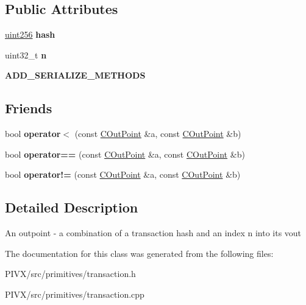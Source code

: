 \subsection*{Public Attributes}
\begin{DoxyCompactItemize}
\item 
\mbox{\label{class_c_out_point_af131c7194a660558b0ff158f4efa7a28}} 
\mbox{\hyperlink{classuint256}{uint256}} {\bfseries hash}
\item 
\mbox{\label{class_c_out_point_a1b857e3a0412ff741da2c9f8defe315c}} 
uint32\+\_\+t {\bfseries n}
\item 
\mbox{\label{class_c_out_point_ac025da4b121ed1bca9a4d88bcb9d3a90}} 
{\bfseries A\+D\+D\+\_\+\+S\+E\+R\+I\+A\+L\+I\+Z\+E\+\_\+\+M\+E\+T\+H\+O\+DS}
\end{DoxyCompactItemize}
\subsection*{Friends}
\begin{DoxyCompactItemize}
\item 
\mbox{\label{class_c_out_point_a83395b7e70479c621c95e1a0d7f2497c}} 
bool {\bfseries operator$<$} (const \mbox{\hyperlink{class_c_out_point}{C\+Out\+Point}} \&a, const \mbox{\hyperlink{class_c_out_point}{C\+Out\+Point}} \&b)
\item 
\mbox{\label{class_c_out_point_a30d4f5afdf664bb4ea5a3496bbc2bd12}} 
bool {\bfseries operator==} (const \mbox{\hyperlink{class_c_out_point}{C\+Out\+Point}} \&a, const \mbox{\hyperlink{class_c_out_point}{C\+Out\+Point}} \&b)
\item 
\mbox{\label{class_c_out_point_a212e1733899b0444f0e4e1e3deae33b1}} 
bool {\bfseries operator!=} (const \mbox{\hyperlink{class_c_out_point}{C\+Out\+Point}} \&a, const \mbox{\hyperlink{class_c_out_point}{C\+Out\+Point}} \&b)
\end{DoxyCompactItemize}


\subsection{Detailed Description}
An outpoint -\/ a combination of a transaction hash and an index n into its vout 

The documentation for this class was generated from the following files\+:\begin{DoxyCompactItemize}
\item 
P\+I\+V\+X/src/primitives/transaction.\+h\item 
P\+I\+V\+X/src/primitives/transaction.\+cpp\end{DoxyCompactItemize}
